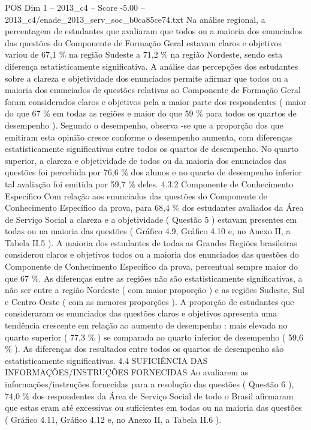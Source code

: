 \begin{textsample}{POS Dim 1 – 2013\_c4 – Score -5.00 – 2013\_c4/enade\_2013\_serv\_soc\_b0ca85ce74.txt}
Na análise regional, a percentagem de estudantes que avaliaram que todos ou a maioria dos enunciados das questões do Componente de Formação Geral estavam claros e objetivos variou de 67,1 \% na região Sudeste a 71,2 \% na região Nordeste, sendo esta diferença estatisticamente significativa.
A análise das percepções dos estudantes sobre a clareza e objetividade dos enunciados permite afirmar que todos ou a maioria dos enunciados de questões relativas ao Componente de Formação Geral foram considerados claros e objetivos pela a maior parte dos respondentes ( maior do que 67 \% em todas as regiões e maior do que 59 \% para todos os quartos de desempenho ).
Segundo o desempenho, observa -se que a proporção dos que emitiram esta opinião cresce conforme o desempenho aumenta, com diferenças estatisticamente significativas entre todos os quartos de desempenho.
No quarto superior, a clareza e objetividade de todos ou da maioria dos enunciados das questões foi percebida por 76,6 \% dos alunos e no quarto de desempenho inferior tal avaliação foi emitida por 59,7 \% deles. 4.3.2 Componente de Conhecimento Específico Com relação aos enunciados das questões do Componente de Conhecimento Específico da prova, para 68,4 \% dos estudantes avaliados da Área de Serviço Social a clareza e a objetividade ( Questão 5 ) estavam presentes em todas ou na maioria das questões ( Gráfico 4.9, Gráfico 4.10 e, no Anexo II, a Tabela II.5 ).
A maioria dos estudantes de todas as Grandes Regiões brasileiras considerou claros e objetivos todos ou a maioria dos enunciados das questões do Componente de Conhecimento Específico da prova, percentual sempre maior do que 67 \%.
As diferenças entre as regiões não são estatisticamente significativas, a não ser entre a região Nordeste ( com maior proporção ) e as regiões Sudeste, Sul e Centro-Oeste ( com as menores proporções ).
A proporção de estudantes que consideraram os enunciados das questões claros e objetivos apresenta uma tendência crescente em relação ao aumento de desempenho : mais elevada no quarto superior ( 77,3 \% ) se comparada ao quarto inferior de desempenho ( 59,6 \% ).
As diferenças dos resultados entre todos os quartos de desempenho são estatisticamente significativas. 4.4 SUFICIÊNCIA DAS INFORMAÇÕES/INSTRUÇÕES FORNECIDAS Ao avaliarem as informações/instruções fornecidas para a resolução das questões ( Questão 6 ), 74,0 \% dos respondentes da Área de Serviço Social de todo o Brasil afirmaram que estas eram até excessivas ou suficientes em todas ou na maioria das questões ( Gráfico 4.11, Gráfico 4.12 e, no Anexo II, a Tabela II.6 ).

\end{textsample}
